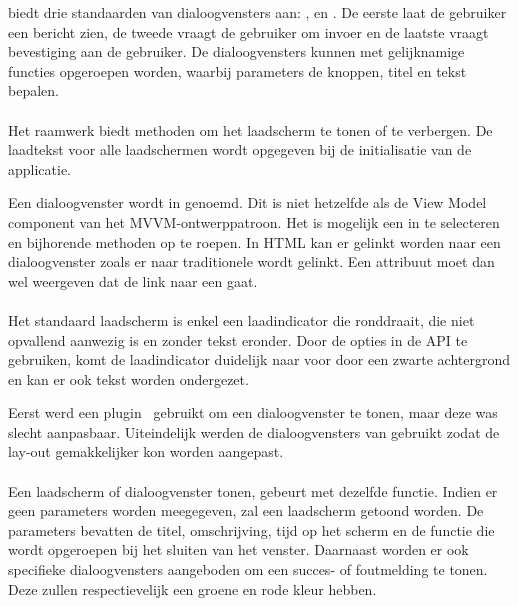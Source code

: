 \st{} biedt drie standaarden van dialoogvensters aan: ,  en .
De eerste laat de gebruiker een bericht zien,  de tweede vraagt de gebruiker om invoer en de laatste vraagt bevestiging aan de gebruiker.
De dialoogvensters kunnen met gelijknamige functies opgeroepen worden,  waarbij parameters de knoppen, titel en tekst bepalen.

\paragraph{\kendo}
Het raamwerk biedt methoden om het laadscherm te tonen of te verbergen.
De laadtekst voor alle laadschermen wordt opgegeven bij de initialisatie van de applicatie.

Een dialoogvenster wordt in \kendo{}  genoemd.
Dit is niet hetzelfde als de View Model component van het MVVM-ontwerppatroon.
Het is mogelijk een  in \js{} te selecteren en bijhorende methoden op te roepen.
In HTML kan er gelinkt worden naar een dialoogvenster zoals er naar traditionele  wordt gelinkt.
Een attribuut moet dan wel weergeven dat de link naar een  gaat.

\paragraph{\jqm}
Het standaard laadscherm is enkel een laadindicator die ronddraait, die niet opvallend aanwezig is en zonder tekst eronder.
Door de opties in de API te gebruiken, komt de laadindicator duidelijk naar voor door een zwarte achtergrond en kan er ook tekst worden ondergezet.

Eerst werd een plugin~\cite{Sage2013} gebruikt om een dialoogvenster te tonen, maar deze was slecht aanpasbaar.
Uiteindelijk werden de dialoogvensters van \jqm{} gebruikt zodat de lay-out gemakkelijker kon worden aangepast.

\paragraph{\lungo}
Een laadscherm of dialoogvenster tonen, gebeurt met dezelfde functie.
Indien er geen parameters worden meegegeven, zal een laadscherm getoond worden.
De parameters bevatten de titel, omschrijving, tijd op het scherm en de functie die wordt opgeroepen bij het sluiten van het venster.
Daarnaast worden er ook specifieke dialoogvensters aangeboden om een succes- of foutmelding te tonen.
Deze zullen respectievelijk een groene en rode kleur hebben.

